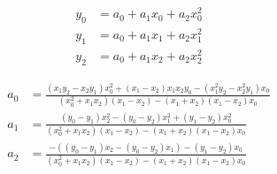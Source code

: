 \begin{align}
  y_0 & = a_0+a_1 x_0+a_2 x_0^{2}  \\
   y_1 & = a_0+a_1 x_1+a_2 x_1^{2}  \\
   y_2 & = a_0+a_1 x_2+a_2 x_2^{2}  
\end{align}

 
\begin{align}
  a_0 & = \frac
{ \left( x_1 y_2 - x_2 y_1 \right)  x_0^{2}+ \left( x_1 - x_2 \right)  x_1 x_2 y_0 -   \left( x_1^{2} y_2 - x_2^{2} y_1 \right)  x_0}
{ \left( x_0^{2}+x_1 x_2  \right)   \left( x_1 - x_2 \right)  -  \left( x_1+x_2 \right)   \left( x_1 - x_2 \right)  x_0 } \\
   a_1 & = \frac
{ \left( y_0 - y_1 \right)  x_2^{2} -  \left( y_0 - y_2 \right)  x_1^{2}+  \left( y_1 - y_2 \right)  x_0^{2}}
{ \left( x_0^{2}+x_1 x_2 \right)   \left(  x_1 - x_2 \right)  -  \left( x_1+x_2 \right)   \left( x_1 - x_2 \right)  x_0} \\
   a_2 & = \frac
{  -  \left(  \left( y_0 - y_1 \right)  x_2 -  \left( y_0 - y_2 \right)  x_1 \right)  -  \left( y_1 - y_2  \right)  x_0}
{ \left( x_0^{2}+x_1 x_2 \right)   \left( x_1 - x_2 \right)  -   \left( x_1+x_2 \right)   \left( x_1 - x_2 \right)  x_0} 
\end{align}
